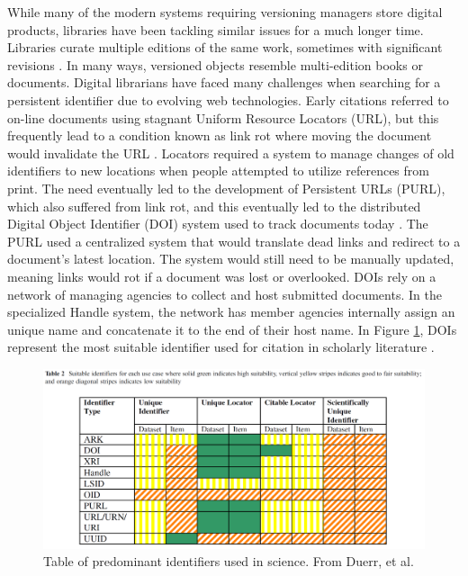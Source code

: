 While many of the modern systems requiring versioning managers store digital products, libraries have been tackling similar issues for a much longer time.
Libraries curate multiple editions of the same work, sometimes with significant revisions \cite{Wiil:2000:RDH:338407.338517}.
In many ways, versioned objects resemble multi-edition books or documents.
Digital librarians have faced many challenges when searching for a persistent identifier due to evolving web technologies.
Early citations referred to on-line documents using stagnant Uniform Resource Locators (URL), but this frequently lead to a condition known as link rot where moving the document would invalidate the URL \cite{Lyons2005}.
Locators required a system to manage changes of old identifiers to new locations when people attempted to utilize references from print.
The need eventually led to the development of Persistent URLs (PURL), which also suffered from link rot, and this eventually led to the distributed Digital Object Identifier (DOI) system used to track documents today \cite{Duerr2011}.
The PURL used a centralized system that would translate dead links and redirect to a document's latest location.
The system would still need to be manually updated, meaning links would rot if a document was lost or overlooked.
DOIs rely on a network of managing agencies to collect and host submitted documents.
In the specialized Handle system, the network has member agencies internally assign an unique name and concatenate it to the end of their host name.
In Figure \ref{table:Duerr}, DOIs represent the most suitable identifier used for citation in scholarly literature \cite{Duerr2011}.
\begin{figure}
	\centering
	\includegraphics[scale=0.30]{figures/DigitalIdentifierTable.png}
	\caption[Table of predominant identifiers used in science.]{Table of predominant identifiers used in science.  From Duerr, et al. \cite{Duerr2011}}
	\label{table:Duerr}
\end{figure}
